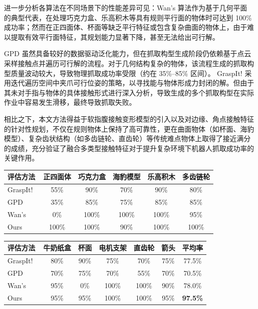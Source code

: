 进一步分析各算法在不同场景下的性能差异可见：Wan's 算法作为基于几何平面的典型代表，在处理巧克力盒、乐高积木等具有规则平行面的物体时可达到 100\% 成功率；然而在正四面体、杯面等缺乏平行特征或包含复杂曲面的物体上，由于难以提取有效平行面特征，其规划能力显著下降，甚至无法给出可行解。

GPD 虽然具备较好的数据驱动泛化能力，但在抓取构型生成阶段仍依赖基于点云采样接触点并遍历可行解的流程。对于几何结构复杂的物体，该流程生成的抓取构型质量波动较大，导致物理抓取成功率受限（约在 35\%--85\% 区间）。
GraspIt! 采用迭代遍历空间中夹爪可行位姿的策略，以寻找能与物体形成力封闭的解。但由于其未对手指与物体的具体接触形式进行深入分析，导致生成的多个抓取构型在实际作业中容易发生滑移，最终导致抓取失败。

相比之下，本文方法得益于软指腹接触变形模型的引入以及对边缘、角点接触特征的针对性规划，不仅在规则物体上保持了高可靠性，更在曲面物体（如杯面、海豹模型）、复杂齿状结构（如多齿链轮、直齿轮）等传统难点物体上取得了接近满分的成绩，充分验证了融合多类型接触特征对于提升复杂环境下机器人抓取成功率的关键作用。
\begin{table}[htbp]
    \centering
    \small
    \label{tab:statistical_results}
    \begin{threeparttable}
    \setlength{\tabcolsep}{13pt}
    \begin{tabular}{lccccc}
        \toprule
        评估方法 & 正四面体 & 巧克力盒 & 海豹模型 & 乐高积木 & 多齿链轮 \\
        \midrule
        GraspIt!~\cite{miller_graspit_2021} & 55\% & 90\% & 70\% & 90\% & 80\% \\
        GPD~\cite{tenpas_grasp_2017} & 35\% & 85\% & 75\% & 85\% & 85\% \\
        Wan's~\cite{wan_planning_2021} & 0\% & 100\% & 100\% & 100\% & 95\% \\
        Ours & 100\% & 100\% & 90\% & 100\% & 100\% \\
    \end{tabular}

    \setlength{\tabcolsep}{12.5pt}
    \begin{tabular}{lccccc c}
        \toprule
        评估方法 & 牛奶纸盒 & 杯面 & 电机支架 & 直齿轮 & 箭头 & 平均率 \\
        \midrule
        GraspIt!~\cite{miller_graspit_2021} & 80\% & 90\% & 75\% & 70\% & 75\% & 77.5\% \\
        GPD~\cite{tenpas_grasp_2017} & 70\% & 75\% & 70\% & 55\% & 70\% & 70.5\% \\
        Wan's~\cite{wan_planning_2021} & 95\% & 0\% & 100\% & 100\% & 90\% & 78.0\% \\
        Ours & 95\% & 95\% & 100\% & 100\% & 95\% & \textbf{97.5\%} \\
        \bottomrule
    \end{tabular}
    \end{threeparttable}
\end{table}

